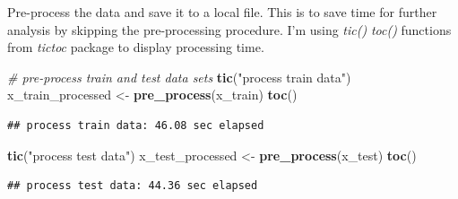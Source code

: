 \documentclass[]{article}
\newenvironment{Shaded}{\begin{snugshade}}{\end{snugshade}}
\newcommand{\CommentTok}[1]{\textcolor[rgb]{0.56,0.35,0.01}{\textit{#1}}}
\newcommand{\ControlFlowTok}[1]{\textcolor[rgb]{0.13,0.29,0.53}{\textbf{#1}}}
\newcommand{\DataTypeTok}[1]{\textcolor[rgb]{0.13,0.29,0.53}{#1}}
\newcommand{\KeywordTok}[1]{\textcolor[rgb]{0.13,0.29,0.53}{\textbf{#1}}}
\newcommand{\NormalTok}[1]{#1}
\newcommand{\OperatorTok}[1]{\textcolor[rgb]{0.81,0.36,0.00}{\textbf{#1}}}
\newcommand{\StringTok}[1]{\textcolor[rgb]{0.31,0.60,0.02}{#1}}
\begin{document}
Pre-process the data and save it to a local file. This is to save time
for further analysis by skipping the pre-processing procedure. I'm using
\emph{tic()} \emph{toc()} functions from \emph{tictoc} package to
display processing time.

\begin{Shaded}
\begin{Highlighting}[]
\CommentTok{# pre-process train and test data sets}
\KeywordTok{tic}\NormalTok{(}\StringTok{"process train data"}\NormalTok{)}
\NormalTok{x_train_processed <-}\StringTok{ }\KeywordTok{pre_process}\NormalTok{(x_train)}
\KeywordTok{toc}\NormalTok{()}
\end{Highlighting}
\end{Shaded}

\begin{verbatim}
## process train data: 46.08 sec elapsed
\end{verbatim}

\begin{Shaded}
\begin{Highlighting}[]
\KeywordTok{tic}\NormalTok{(}\StringTok{"process test data"}\NormalTok{)}
\NormalTok{x_test_processed <-}\StringTok{ }\KeywordTok{pre_process}\NormalTok{(x_test)}
\KeywordTok{toc}\NormalTok{()}
\end{Highlighting}
\end{Shaded}

\begin{verbatim}
## process test data: 44.36 sec elapsed
\end{verbatim}

\begin{Shaded}
\end{Shaded}
\end{document}

